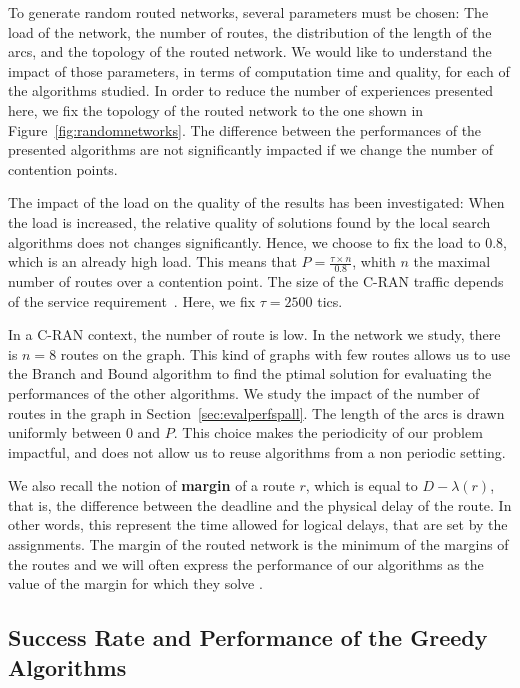 To generate random routed networks, several parameters must be chosen: The load of the network, the number of routes, the distribution of the length of the arcs, and the topology of the routed network. We would like to understand the impact of those parameters, in terms of computation time and quality, for each of the algorithms studied. In order to reduce the number of experiences presented here, we fix the topology of the routed network to the one shown in Figure~\ref{fig:randomnetworks}. The difference between the performances of the presented algorithms are not significantly impacted if we change the number of contention points. 

 
 The impact of the load on the quality of the results has been investigated: When the load is increased, the relative quality of solutions found by the local search algorithms does not changes significantly. Hence, we choose to fix the load to $0.8$, which is an already high load. This means that $P = \frac{\tau \times n}{0.8}$, whith $n$ the maximal number of routes over a contention point. The size of the C-RAN traffic depends of the service requirement~\cite{mobile2011c}. Here, we fix $\tau = 2500$ tics.
  
In a C-RAN context, the number of route is low. In the network we study, there is $n=8$ routes on the graph. This kind of graphs with few routes allows us to use the Branch and Bound algorithm to find the ptimal solution for evaluating the performances of the other algorithms. We study the impact of the number of routes in the graph in Section~\ref{sec:evalperfspall}. The length of the arcs is drawn uniformly between $0$ and $P$. This choice makes the periodicity of our problem impactful, and does not allow  us to reuse algorithms from a non periodic setting.

We also recall the notion of \textbf{margin} of a route $r$, which is equal to $D - \lambda(r)$, that is, the difference between the deadline and the physical delay of the route. In other words, this represent the time allowed for logical delays, that are set by the assignments. The margin of the routed network is the minimum of the margins of the routes
and we will often express the performance of our algorithms as the value of the margin for which they solve \spall.



\subsection{Success Rate and Performance of the Greedy Algorithms}



